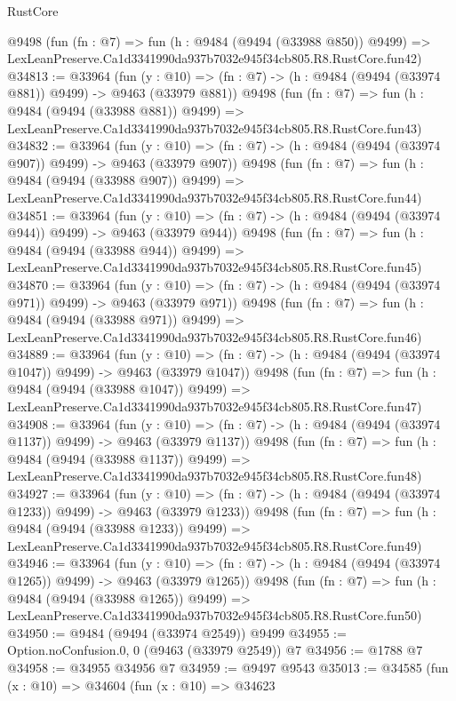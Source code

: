 \begin{lexlean}{RustCore}
\begin{coremodule}
    @9498
    (fun (fn : @7) =>
    fun (h : @9484 (@9494 (@33988 @850)) @9499) =>
    LexLeanPreserve.Ca1d3341990da937b7032e945f34cb805.R8.RustCore.fun42)
@34813 := @33964
    (fun (y : @10) => (fn : @7) -> (h : @9484 (@9494 (@33974 @881)) @9499) -> @9463 (@33979 @881))
    @9498
    (fun (fn : @7) =>
    fun (h : @9484 (@9494 (@33988 @881)) @9499) =>
    LexLeanPreserve.Ca1d3341990da937b7032e945f34cb805.R8.RustCore.fun43)
@34832 := @33964
    (fun (y : @10) => (fn : @7) -> (h : @9484 (@9494 (@33974 @907)) @9499) -> @9463 (@33979 @907))
    @9498
    (fun (fn : @7) =>
    fun (h : @9484 (@9494 (@33988 @907)) @9499) =>
    LexLeanPreserve.Ca1d3341990da937b7032e945f34cb805.R8.RustCore.fun44)
@34851 := @33964
    (fun (y : @10) => (fn : @7) -> (h : @9484 (@9494 (@33974 @944)) @9499) -> @9463 (@33979 @944))
    @9498
    (fun (fn : @7) =>
    fun (h : @9484 (@9494 (@33988 @944)) @9499) =>
    LexLeanPreserve.Ca1d3341990da937b7032e945f34cb805.R8.RustCore.fun45)
@34870 := @33964
    (fun (y : @10) => (fn : @7) -> (h : @9484 (@9494 (@33974 @971)) @9499) -> @9463 (@33979 @971))
    @9498
    (fun (fn : @7) =>
    fun (h : @9484 (@9494 (@33988 @971)) @9499) =>
    LexLeanPreserve.Ca1d3341990da937b7032e945f34cb805.R8.RustCore.fun46)
@34889 := @33964
    (fun (y : @10) => (fn : @7) -> (h : @9484 (@9494 (@33974 @1047)) @9499) -> @9463 (@33979 @1047))
    @9498
    (fun (fn : @7) =>
    fun (h : @9484 (@9494 (@33988 @1047)) @9499) =>
    LexLeanPreserve.Ca1d3341990da937b7032e945f34cb805.R8.RustCore.fun47)
@34908 := @33964
    (fun (y : @10) => (fn : @7) -> (h : @9484 (@9494 (@33974 @1137)) @9499) -> @9463 (@33979 @1137))
    @9498
    (fun (fn : @7) =>
    fun (h : @9484 (@9494 (@33988 @1137)) @9499) =>
    LexLeanPreserve.Ca1d3341990da937b7032e945f34cb805.R8.RustCore.fun48)
@34927 := @33964
    (fun (y : @10) => (fn : @7) -> (h : @9484 (@9494 (@33974 @1233)) @9499) -> @9463 (@33979 @1233))
    @9498
    (fun (fn : @7) =>
    fun (h : @9484 (@9494 (@33988 @1233)) @9499) =>
    LexLeanPreserve.Ca1d3341990da937b7032e945f34cb805.R8.RustCore.fun49)
@34946 := @33964
    (fun (y : @10) => (fn : @7) -> (h : @9484 (@9494 (@33974 @1265)) @9499) -> @9463 (@33979 @1265))
    @9498
    (fun (fn : @7) =>
    fun (h : @9484 (@9494 (@33988 @1265)) @9499) =>
    LexLeanPreserve.Ca1d3341990da937b7032e945f34cb805.R8.RustCore.fun50)
@34950 := @9484 (@9494 (@33974 @2549)) @9499
@34955 := Option.noConfusion.{0, 0} (@9463 (@33979 @2549)) @7
@34956 := @1788 @7
@34958 := @34955 @34956 @7
@34959 := @9497 @9543
@35013 := @34585
    (fun (x : @10) =>
    @34604
      (fun (x : @10) =>
      @34623

\end{coremodule}
\end{lexlean}

